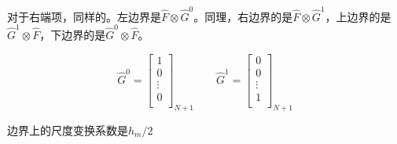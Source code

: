 \documentclass[UTF8,12pt]{article}
\begin{document}
对于右端项，同样的。左边界是$\hat{F} \otimes \hat{G}^0$。同理，右边界的是$\hat{F} \otimes \hat{G}^1$，上边界的是$\hat{G}^1 \otimes \hat{F}$，下边界的是$\hat{G}^0 \otimes \hat{F}$。

\begin{equation}
\hat{G}^0 = \left[ \begin{array}{c}
1 \\
0 \\
\vdots \\
0 \\
\end{array} \right]_{N+1}
\qquad
\hat{G}^1 = \left[ \begin{array}{c}
0 \\
0 \\
\vdots \\
1 \\
\end{array} \right]_{N+1}
\end{equation}

边界上的尺度变换系数是$h_m/2$

\end{document}
